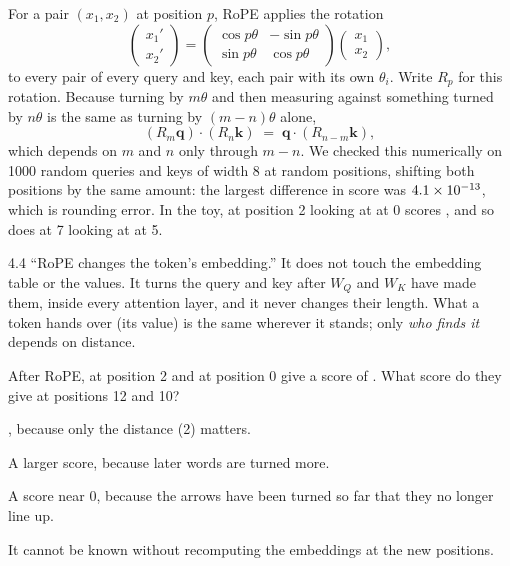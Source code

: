 \Exactly For a pair $(x_1, x_2)$ at position $p$, RoPE applies the rotation
\[
\begin{pmatrix} x_1' \\ x_2' \end{pmatrix} =
\begin{pmatrix} \cos p\theta & -\sin p\theta \\ \sin p\theta & \cos p\theta \end{pmatrix}
\begin{pmatrix} x_1 \\ x_2 \end{pmatrix},
\]
to every pair of every query and key, each pair with its own $\theta_i$. Write $R_p$ for this rotation.
Because turning by $m\theta$ and then measuring against something turned by $n\theta$ is the same as
turning by $(m-n)\theta$ alone,
\[
(R_m\bm{q})\cdot(R_n\bm{k}) \;=\; \bm{q}\cdot(R_{n-m}\bm{k}),
\]
which depends on $m$ and $n$ only through $m-n$. We checked this numerically on 1000 random queries and
keys of width 8 at random positions, shifting both positions by the same amount: the largest difference
in score was $4.1\times10^{-13}$, which is rounding error. In the toy,  at position 2 looking at
 at 0 scores \nFourRelScore, and so does  at 7 looking at  at 5.

\begin{wrongidea}{4.4}
``RoPE changes the token's embedding.'' It does not touch the embedding table or the values. It turns
the query and key after $W_Q$ and $W_K$ have made them, inside every attention layer, and it never changes
their length. What a token hands over (its value) is the same wherever it stands; only \emph{who finds
it} depends on distance.
\end{wrongidea}

\begin{checkq}
After RoPE,  at position 2 and  at position 0 give a score of \nFourRelScore. What
score do they give at positions 12 and 10?
\begin{options}
\item \nFourRelScore, because only the distance (2) matters.
\item A larger score, because later words are turned more.
\item A score near 0, because the arrows have been turned so far that they no longer line up.
\item It cannot be known without recomputing the embeddings at the new positions.
\end{options}
\end{checkq}

